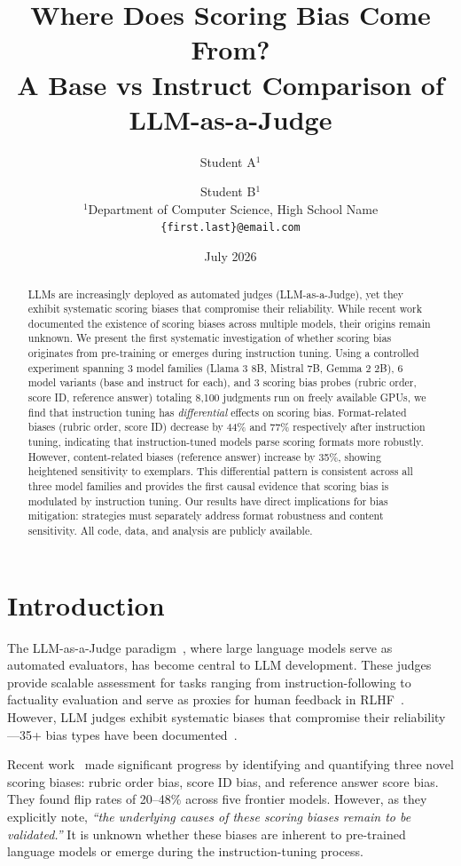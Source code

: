 \documentclass[11pt]{article}
\title{Where Does Scoring Bias Come From?\\A Base vs Instruct Comparison of LLM-as-a-Judge}
\author{Student A$^{1}$ \and Student B$^{1}$ \\
$^{1}$Department of Computer Science, High School Name \\
\texttt{\{first.last\}@email.com}}
\date{July 2026}
\begin{document}
\maketitle

\begin{abstract}
LLMs are increasingly deployed as automated judges (LLM-as-a-Judge), yet they exhibit systematic scoring biases that compromise their reliability. While recent work~\cite{li2025scoring} documented the existence of scoring biases across multiple models, their origins remain unknown. We present the first systematic investigation of whether scoring bias originates from pre-training or emerges during instruction tuning. Using a controlled experiment spanning 3 model families (Llama 3 8B, Mistral 7B, Gemma 2 2B), 6 model variants (base and instruct for each), and 3 scoring bias probes (rubric order, score ID, reference answer) totaling 8,100 judgments run on freely available GPUs, we find that instruction tuning has \emph{differential} effects on scoring bias. Format-related biases (rubric order, score ID) decrease by 44\% and 77\% respectively after instruction tuning, indicating that instruction-tuned models parse scoring formats more robustly. However, content-related biases (reference answer) increase by 35\%, showing heightened sensitivity to exemplars. This differential pattern is consistent across all three model families and provides the first causal evidence that scoring bias is modulated by instruction tuning. Our results have direct implications for bias mitigation: strategies must separately address format robustness and content sensitivity. All code, data, and analysis are publicly available.
\end{abstract}

\section{Introduction}

The LLM-as-a-Judge paradigm~\cite{zheng2023judging}, where large language models serve as automated evaluators, has become central to LLM development. These judges provide scalable assessment for tasks ranging from instruction-following to factuality evaluation and serve as proxies for human feedback in RLHF~\cite{bai2022constitutional}. However, LLM judges exhibit systematic biases that compromise their reliability---35+ bias types have been documented~\cite{ye2024justice,chen2024humans}.

Recent work~\cite{li2025scoring} made significant progress by identifying and quantifying three novel scoring biases: rubric order bias, score ID bias, and reference answer score bias. They found flip rates of 20--48\% across five frontier models. However, as they explicitly note, \emph{``the underlying causes of these scoring biases remain to be validated.''} It is unknown whether these biases are inherent to pre-trained language models or emerge during the instruction-tuning process.
\end{document}
